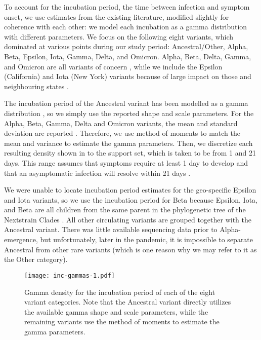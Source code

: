 To account for the incubation period, the time between infection and symptom
onset, we use estimates from the existing literature, modified slightly for
coherence with each other: we model each incubation as a gamma distribution with
different parameters. We focus on the following eight variants, which dominated
at various points during our study period: Ancestral/Other, Alpha, Beta, Epsilon,
Iota, Gamma, Delta, and Omicron. Alpha, Beta, Delta, Gamma, and Omicron are all
variants of concern \citep{who2021tracking}, while we include the Epsilon
(California) and Iota (New York) variants because of large impact on those and
neighbouring states \citep{yang2022investigation, duerr2021dominance}.

The incubation period of the Ancestral variant has been modelled as a gamma distribution
\citep{tindale2020evidence}, so we simply use the reported shape and scale parameters. For the
Alpha, Beta, Gamma, Delta and Omicron variants, the mean and standard deviation are reported
\citep{tanaka2022shorter, grant2022impact, ogata2022shorter}. 
Therefore, we use method of moments to match the mean and variance to estimate the gamma parameters. 
Then, we discretize each resulting density shown in  to the
support set, which is taken to be from 1 and 21 days. This range assumes that
symptoms require at least 1 day to develop \citealp{phcan2021covid} and that an
asymptomatic infection will resolve within 21 days
\citep{zaki2021estimations,cortes2022sars}.

We were unable to locate incubation period estimates for the geo-specific
Epsilon and Iota variants, so we use the incubation period for Beta because
Epsilon, Iota, and Beta are all children from the same parent in the
phylogenetic tree of the Nextstrain Clades \citep{hodcroft2021covariants}. All
other circulating variants are grouped together with the Ancestral variant.
There was little available sequencing data prior to Alpha-emergence, but
unfortunately, later in the pandemic, it is impossible to separate Ancestral
from other rare variants (which is one reason why we may refer to it as the Other category).

\begin{figure}[!tb]
\centering
    \texttt{[image: inc-gammas-1.pdf]}
    \caption{Gamma density for the incubation period of each of the eight
    variant categories. Note that the Ancestral variant directly utilizes the
    available gamma shape and scale parameters, while the remaining variants use
    the method of moments to estimate the gamma parameters.}
    \label{fig:inc_gammas}
\end{figure}
    


